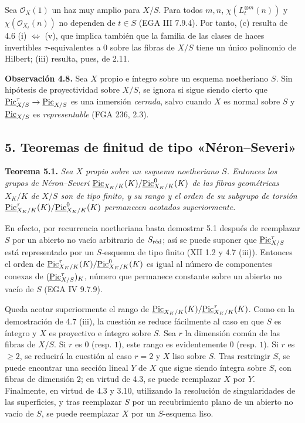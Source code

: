 Sea $\mathcal O_X(1)$ un haz muy amplio para $X/S$. Para todos $m,n$,
$\chi(L_t^{\otimes m}(n))$ y $\chi(\mathcal O_{X_t}(n))$ no dependen de
$t\in S$ (EGA III 7.9.4). Por tanto, (c) resulta de
4.6 (i) $\Longleftrightarrow$ (v), que implica también que la familia de las
clases de haces invertibles $\tau$-equivalentes a $0$ sobre las fibras de
$X/S$ tiene un único polinomio de Hilbert; (iii) resulta, pues, de 2.11.

\textbf{Observación 4.8.} Sea $X$ propio e íntegro sobre un esquema
noetheriano $S$. Sin hipótesis de proyectividad sobre $X/S$, se ignora si
sigue siendo cierto que
$\underline{\Pic}^\tau_{X/S}\to\underline{\Pic}_{X/S}$ es una inmersión
\emph{cerrada}, salvo cuando $X$ es normal sobre $S$ y
$\underline{\Pic}_{X/S}$ es \emph{representable} (FGA 236, 2.3).

\providecommand{\NS}{\operatorname{NS}}
\providecommand{\Picard}{\operatorname{Pic}}
\providecommand{\Et}{\mathrm{et}}
\providecommand{\rk}{\operatorname{rk}}
\providecommand{\im}{\operatorname{Im}}
\providecommand{\HH}{\mathrm H}

\subsection*{5. Teoremas de finitud de tipo «Néron--Severi»}

\textbf{Teorema 5.1.} \emph{Sea $X$ propio sobre un esquema noetheriano
$S$. Entonces los grupos de Néron--Severi
$\underline{\Pic}_{X_K/K}(K)/\underline{\Pic}^0_{X_K/K}(K)$ de las fibras
geométricas $X_K/K$ de $X/S$ son de tipo finito, y su rango y el orden de su
subgrupo de torsión
$\underline{\Pic}^\tau_{X_K/K}(K)/\underline{\Pic}^0_{X_K/K}(K)$
permanecen acotados superiormente.}

En efecto, por recurrencia noetheriana basta demostrar 5.1 después de
reemplazar $S$ por un abierto no vacío arbitrario de $S_{\red}$; así se
puede suponer que $\underline{\Pic}^\tau_{X/S}$ está representado por un
$S$-esquema de tipo finito (XII 1.2 y 4.7 (iii)). Entonces el orden de
$\underline{\Pic}^\tau_{X_K/K}(K)/\underline{\Pic}^0_{X_K/K}(K)$ es igual
al número de componentes conexas de
$(\underline{\Pic}^\tau_{X/S})_K$, número que permanece constante sobre un
abierto no vacío de $S$ (EGA IV 9.7.9).

Queda acotar superiormente el rango de
$\underline{\Pic}_{X_K/K}(K)/\underline{\Pic}^\tau_{X_K/K}(K)$. Como en la
demostración de 4.7 (iii), la cuestión se reduce fácilmente al caso en que
$S$ es íntegro y $X$ es proyectivo e íntegro sobre $S$. Sea \(r\) la dimensión
común de las fibras de $X/S$. Si \(r\) es \(0\) (resp. \(1\)), este rango es
evidentemente $0$ (resp. $1$). Si \(r\) es \(\geq2\), se reducirá la cuestión al caso
$r=2$ y $X$ liso sobre $S$. Tras restringir $S$, se puede encontrar una
sección lineal $Y$ de $X$ que sigue siendo íntegra sobre $S$, con fibras de
dimensión $2$; en virtud de 4.3, se puede reemplazar $X$ por $Y$. Finalmente,
en virtud de 4.3 y 3.10, utilizando la resolución de singularidades de las
superficies, y tras reemplazar $S$ por un recubrimiento plano de un abierto
no vacío de $S$, se puede reemplazar $X$ por un $S$-esquema liso.

